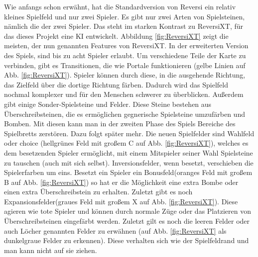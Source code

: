 \documentclass[12pt,a4paper,bibliography=totocnumbered,listof=totocnumbered]{scrartcl}
\begin{document}
    Wie anfangs schon erwähnt, hat die Standardversion von Reversi ein relativ kleines Spielfeld und nur zwei Spieler. Es gibt nur zwei Arten von Spielsteinen, nämlich die der zwei Spieler. Das steht im starken Kontrast zu ReversiXT, für das dieses Projekt eine KI entwickelt. Abbildung \ref{fig:ReversiXT} zeigt die meisten, der nun genannten Features von ReversiXT. In der erweiterten Version des Spiels, sind bis zu acht Spieler erlaubt. Um verschiedene Teile der Karte zu verbinden, gibt es Transitionen, die wie \glqq Portale \grqq{} funktionieren (gelbe Linien auf Abb. \ref{fig:ReversiXT}). Spieler können durch diese, in die ausgehende Richtung, das Zielfeld über die dortige Richtung färben. Dadurch wird das Spielfeld nochmal komplexer und für den Menschen schwerer zu überblicken.  Außerdem gibt einige Sonder-Spielsteine und Felder. Diese Steine bestehen aus \glqq Überschreibsteinen\grqq, die es ermöglichen gegnerische Spielsteine umzufärben und \glqq Bomben\grqq. Mit diesen kann man in der zweiten Phase des Spiels Bereiche des Spielbretts zerstören. Dazu folgt später mehr. Die neuen Spielfelder sind \glqq Wahlfeld\grqq{} oder \glqq choice \grqq{} (hellgrünes Feld mit großem C auf Abb. \ref{fig:ReversiXT}), welches es dem besetzenden Spieler ermöglicht, mit einem Mitspieler seiner Wahl Spielsteine zu tauschen (auch mit sich selbst). \glqq Inversionsfelder\grqq, wenn besetzt, verschieben die Spielerfarben um eins. Besetzt ein Spieler ein \glqq Bonusfeld\grqq (oranges Feld mit großem B auf Abb. \ref{fig:ReversiXT}) so hat er die Möglichkeit eine extra Bombe oder einen extra Überschreibstein zu erhalten. Zuletzt gibt es noch \glqq Expansionsfelder\grqq (graues Feld mit großem X auf Abb. \ref{fig:ReversiXT}). Diese agieren wie \glqq tote\grqq{} Spieler und können durch normale Züge oder das Platzieren von Überschreibsteinen eingefärbt werden. Zuletzt gilt es noch die leeren Felder oder auch \glqq Löcher \grqq{} genannten Felder zu erwähnen (auf Abb. \ref{fig:ReversiXT} als dunkelgraue Felder zu erkennen). Diese verhalten sich wie der Spielfeldrand und man kann nicht auf sie ziehen.
    
\end{document}
